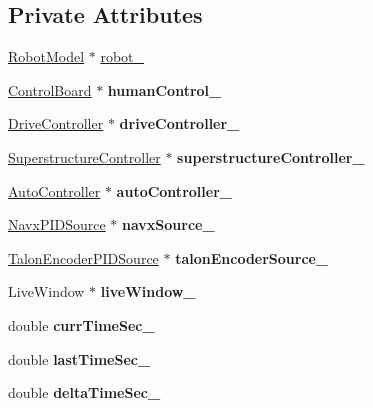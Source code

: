 \subsection*{Private Attributes}
\begin{DoxyCompactItemize}
\item 
\hyperlink{class_robot_model}{Robot\+Model} $\ast$ \hyperlink{class_main_program_a2d74d25ebc0a0bc52daa34a0048e071d}{robot\+\_\+}
\item 
\mbox{\label{class_main_program_a8b0df9956703e91662bef87dbe6552c6}} 
\hyperlink{class_control_board}{Control\+Board} $\ast$ {\bfseries human\+Control\+\_\+}
\item 
\mbox{\label{class_main_program_ad4224352ece515213597c083c02d89bc}} 
\hyperlink{class_drive_controller}{Drive\+Controller} $\ast$ {\bfseries drive\+Controller\+\_\+}
\item 
\mbox{\label{class_main_program_a0dfd4823ff497148a70f22b0dfccd230}} 
\hyperlink{class_superstructure_controller}{Superstructure\+Controller} $\ast$ {\bfseries superstructure\+Controller\+\_\+}
\item 
\mbox{\label{class_main_program_ac3d5377aaf3e901441354f9c9d641453}} 
\hyperlink{class_auto_controller}{Auto\+Controller} $\ast$ {\bfseries auto\+Controller\+\_\+}
\item 
\mbox{\label{class_main_program_a0d647c9c206c23ac1ec4b00d01629882}} 
\hyperlink{class_navx_p_i_d_source}{Navx\+P\+I\+D\+Source} $\ast$ {\bfseries navx\+Source\+\_\+}
\item 
\mbox{\label{class_main_program_a947acca7d8e91d05bee0e5aedd334240}} 
\hyperlink{class_talon_encoder_p_i_d_source}{Talon\+Encoder\+P\+I\+D\+Source} $\ast$ {\bfseries talon\+Encoder\+Source\+\_\+}
\item 
\mbox{\label{class_main_program_abe37903ef51d2df9dc89f69a32e8da67}} 
Live\+Window $\ast$ {\bfseries live\+Window\+\_\+}
\item 
\mbox{\label{class_main_program_a180a107906b59bbdadce0a366a952da5}} 
double {\bfseries curr\+Time\+Sec\+\_\+}
\item 
\mbox{\label{class_main_program_a6c22d1b8be27e874668c2cb240f0aaa8}} 
double {\bfseries last\+Time\+Sec\+\_\+}
\item 
\mbox{\label{class_main_program_a3259650f3390bc05a34f9ca2b58bc5bb}} 
double {\bfseries delta\+Time\+Sec\+\_\+}
\end{DoxyCompactItemize}


